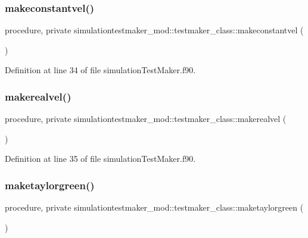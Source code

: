 \subsubsection{\texorpdfstring{makeconstantvel()}{makeconstantvel()}}
{\footnotesize\ttfamily procedure, private simulationtestmaker\+\_\+mod\+::testmaker\+\_\+class\+::makeconstantvel (\begin{DoxyParamCaption}{ }\end{DoxyParamCaption})\hspace{0.3cm}{\ttfamily [private]}}



Definition at line 34 of file simulation\+Test\+Maker.\+f90.

\mbox{\label{structsimulationtestmaker__mod_1_1testmaker__class_ad287a21d287f559c376017929c048786}} 
\subsubsection{\texorpdfstring{makerealvel()}{makerealvel()}}
{\footnotesize\ttfamily procedure, private simulationtestmaker\+\_\+mod\+::testmaker\+\_\+class\+::makerealvel (\begin{DoxyParamCaption}{ }\end{DoxyParamCaption})\hspace{0.3cm}{\ttfamily [private]}}



Definition at line 35 of file simulation\+Test\+Maker.\+f90.

\mbox{\label{structsimulationtestmaker__mod_1_1testmaker__class_a5beeed7f1010481f6d7880dda99c6f52}} 
\subsubsection{\texorpdfstring{maketaylorgreen()}{maketaylorgreen()}}
{\footnotesize\ttfamily procedure, private simulationtestmaker\+\_\+mod\+::testmaker\+\_\+class\+::maketaylorgreen (\begin{DoxyParamCaption}{ }\end{DoxyParamCaption})\hspace{0.3cm}{\ttfamily [private]}}



